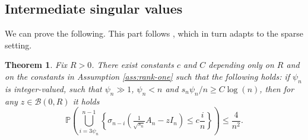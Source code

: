 \documentclass[11pt,oneside]{amsart}
\theoremstyle{plain}
\newtheorem{theorem}{Theorem}[section]
\numberwithin{equation}{section}
\newcommand{\p}{\mathbb{P}}
\newcommand{\scaling}{s_n}
\begin{document}
\subsection{Intermediate singular values}
We can prove the following.
This part follows \cite[Lemma 3.5]{BCC14}, which in turn adapts \cite[Proposition 5.1]{TVK} to the sparse setting. 
\begin{theorem} \label{thm:intermediate-SVs} Fix $R>0$. There exist constants $c$ and $C$ depending only on $R$ and on the constants in Assumption \ref{ass:rank-one} such that the following holds: if $\psi_n$ is integer-valued, such that $\psi_n \gg 1$, $\psi_n <
n$ and $\scaling \psi_n/n \ge C \log(n)$, then for any $z \in \mathcal{B}(0,R)$ it holds
\begin{equation} \label{eq:thesis}
    \p\left( 
    \bigcup^{n-1}_{i=3\psi_n}
\left\{\sigma_{n-i}\left(\tfrac{1}{\sqrt{\scaling}}{{A}_n}-zI_n\right)\le c\frac{i}{n}\right\}\right)\le\frac{4}{n^2}.
\end{equation}
\end{theorem}
\end{document}
